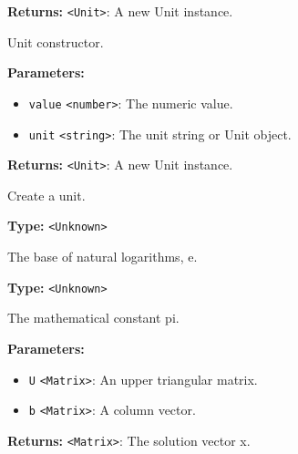 \documentclass[12pt,a4paper]{article}
\begin{document}
\noindent \textbf{Returns:} \texttt{<Unit>}: A new Unit instance.

\noindent Unit constructor.

\vspace{5mm}
\noindent {}


\noindent \textbf{Parameters:}
\begin{itemize}
  \item \texttt{value} \texttt{<number>}: The numeric value.
  \item \texttt{unit} \texttt{<string>}: The unit string or Unit object.
\end{itemize}

\noindent \textbf{Returns:} \texttt{<Unit>}: A new Unit instance.

\noindent Create a unit.

\vspace{5mm}
\noindent {}\vspace{4mm}


\noindent \textbf{Type:} \texttt{<Unknown>}

\noindent The base of natural logarithms, e.

\vspace{5mm}
\noindent {}\vspace{4mm}


\noindent \textbf{Type:} \texttt{<Unknown>}

\noindent The mathematical constant pi.

\vspace{5mm}
\noindent {}


\noindent \textbf{Parameters:}
\begin{itemize}
  \item \texttt{U} \texttt{<Matrix>}: An upper triangular matrix.
  \item \texttt{b} \texttt{<Matrix>}: A column vector.
\end{itemize}

\noindent \textbf{Returns:} \texttt{<Matrix>}: The solution vector x.
\end{document}
